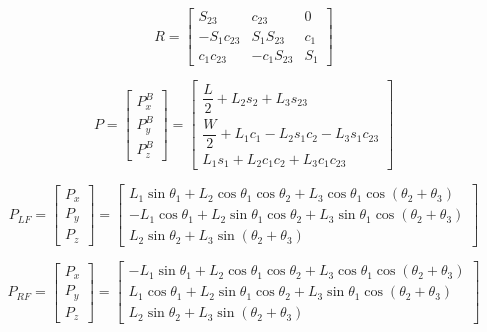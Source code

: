 \begin{equation}
R=
\begin{bmatrix}
S_{23} & c_{23} & 0 \\
- S_1 c_{23} & S_1 S_{23} & c_1 \\
c_1 c_{23} & - c_1 S_{23} & S_1
\end{bmatrix}
\end{equation}

\begin{equation}
P =
\begin{bmatrix}
P_x^B \\
P_y^B \\
P_z^B
\end{bmatrix}
=
\begin{bmatrix}
\dfrac{L}{2}+L_2 s_2 + L_3 s_{23} \\
\dfrac{W}{2}+L_1 c_1 - L_2 s_1 c_2 - L_3 s_1 c_{23} \\
L_1 s_1 + L_2 c_1 c_2 + L_3 c_1 c_{23}
\end{bmatrix}
\end{equation}

\begin{equation}
P_{LF}=
\begin{bmatrix}
P_x \\
P_y \\
P_z
\end{bmatrix}
=
\begin{bmatrix}
L_1\sin\theta_1 + L_2\cos\theta_1\cos\theta_2 + L_3\cos\theta_1\cos(\theta_2+\theta_3) \\
- L_1\cos\theta_1 + L_2\sin\theta_1\cos\theta_2 + L_3\sin\theta_1\cos(\theta_2+\theta_3) \\
L_2\sin\theta_2 + L_3\sin(\theta_2+\theta_3)
\end{bmatrix}
\label{eq:1}
\end{equation}

\begin{equation}
P_{RF}=
\begin{bmatrix}
P_x \\
P_y \\
P_z
\end{bmatrix}
=
\begin{bmatrix}
- L_1\sin\theta_1 + L_2\cos\theta_1\cos\theta_2 + L_3\cos\theta_1\cos(\theta_2+\theta_3) \\
L_1\cos\theta_1 + L_2\sin\theta_1\cos\theta_2 + L_3\sin\theta_1\cos(\theta_2+\theta_3) \\
L_2\sin\theta_2 + L_3\sin(\theta_2+\theta_3)
\end{bmatrix}
\label{eq:2}
\end{equation}

